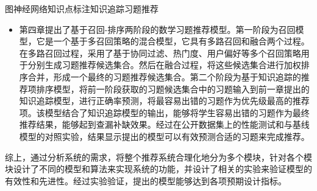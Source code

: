 \begin{abstractC}{图神经网络}{知识点标注}{知识追踪}{习题推荐}{}
\begin{itemize}
        \item 第四章提出了基于召回-排序两阶段的数学习题推荐模型。第一阶段为召回模型，它是一个基于多召回策略的混合模型，它具有多路召回和融合两个过程。在多路召回过程，采用了基于协同过滤、热门度、用户偏好等多个召回策略用于分别生成习题推荐候选集合。然后在融合过程，将这些候选集合进行加权排序合并，形成一个最终的习题推荐候选集合。第二个阶段为基于知识追踪的推荐项排序模型，将前一阶段获取的习题候选集合中的习题输入到前一章提出的知识追踪模型，进行正确率预测，将最容易出错的习题作为优先级最高的推荐项。该模型结合了知识追踪模型的输出，能够将学生容易出错的习题作为最终推荐结果，能够起到查漏补缺效果。经过在公开数据集上的性能测试和与基线模型的对照实验，结果显示提出的模型可以有效预测合适的习题来完成推荐。
    \end{itemize}
    综上，通过分析系统的需求，将整个推荐系统合理化地分为多个模块，针对各个模块设计了不同的模型和算法来实现系统的功能，并设计了相关的实验来验证模型的有效性和先进性。经过实验验证，提出的模型能够达到各项预期设计指标。
\end{abstractC}
